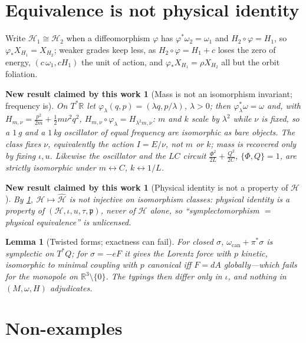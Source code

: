 \documentclass[12pt,a4paper]{article}
\theoremstyle{definition}
\theoremstyle{plain}
\newtheorem{lemma}[definition]{Lemma}
\theoremstyle{commentary}
\newtheorem{newresult}[definition]{New result claimed by this work}
\newcommand{\R}{\mathbb{R}}
\newcommand{\pb}[2]{\{#1,#2\}}
\newcommand{\Hb}{\mathcal{H}}
\newcommand{\Hhat}{\widehat{\mathcal{H}}}
\begin{document}
\section{Equivalence is not physical identity}
\label{sec:equiv}

\noindent Write $\Hb_1\cong\Hb_2$ when a diffeomorphism $\varphi$ has $\varphi^*\omega_2=\omega_1$
and $H_2\circ\varphi=H_1$, so $\varphi_*X_{H_1}=X_{H_2}$; weaker grades keep less, as
$H_2\circ\varphi=H_1+c$ loses the zero of energy, $(c\,\omega_1,cH_1)$ the unit of action, and
$\varphi_*X_{H_1}=\rho X_{H_2}$ all but the orbit foliation.

\begin{newresult}[Mass is not an isomorphism invariant; frequency is]\label{new:mass}
On $T^*\R$ let $\varphi_\lambda(q,p)=(\lambda q,p/\lambda)$, $\lambda>0$; then
$\varphi_\lambda^*\omega=\omega$ and, with $H_{m,\nu}=\tfrac{p^2}{2m}+\tfrac12m\nu^2q^2$,
$H_{m,\nu}\circ\varphi_\lambda=H_{\lambda^2m,\nu}$: $m$ and $k$ scale by $\lambda^2$ while $\nu$ is
fixed, so a $1\,$g and a $1\,$kg oscillator of equal frequency are isomorphic as bare objects. The
class fixes $\nu$, equivalently the action $I=E/\nu$, not $m$ or $k$; mass is recovered only by
fixing $\iota,u$. Likewise the oscillator and the $LC$ circuit $\tfrac{\Phi^2}{2L}+\tfrac{Q^2}{2C}$,
$\pb{\Phi}{Q}=1$, are strictly isomorphic under $m\leftrightarrow C$, $k\leftrightarrow1/L$.
\end{newresult}

\begin{newresult}[Physical identity is not a property of $\Hb$]\label{new:identity}
By \ref{new:mass}, $\Hb\mapsto\Hhat$ is not injective on isomorphism classes: physical identity is a
property of $(\Hb,\iota,u,\tau,\mathfrak{p})$, never of $\Hb$ alone, so ``symplectomorphism $=$
physical equivalence'' is unlicensed.
\end{newresult}

\begin{lemma}[Twisted forms; exactness can fail]\label{lem:twisted}
For closed $\sigma$, $\omega_{\mathrm{can}}+\pi^*\sigma$ is symplectic on $T^*Q$; for $\sigma=-eF$
it gives the Lorentz force with $p$ kinetic, isomorphic to minimal coupling with $p$ canonical iff
$F=dA$ globally---which fails for the monopole on $\R^3\setminus\{0\}$. The typings then differ only
in $\iota$, and nothing in $(M,\omega,H)$ adjudicates.
\end{lemma}

\section{Non-examples}
\label{sec:nonexamples}
\end{document}

